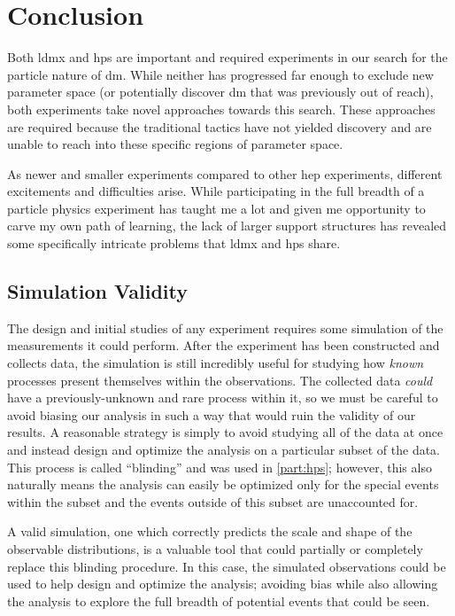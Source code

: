 \chapter{Conclusion}
\label{chapter:conclusion}

Both \ac{ldmx} and \ac{hps} are important and required experiments in our search
for the particle nature of \ac{dm}.
While neither has progressed far enough to exclude new parameter space
(or potentially discover \ac{dm} that was previously out of reach),
both experiments take novel approaches towards this search.
These approaches are required because the traditional tactics have not
yielded discovery and are unable to reach into these specific regions
of parameter space.

As newer and smaller experiments compared to other \ac{hep} experiments,
different excitements and difficulties arise.
While participating in the full breadth of a particle physics experiment
has taught me a lot and given me opportunity to carve my own path of learning,
the lack of larger support structures has revealed some specifically intricate
problems that \ac{ldmx} and \ac{hps} share.

\section{Simulation Validity}
The design and initial studies of any experiment requires some simulation
of the measurements it could perform.
After the experiment has been constructed and collects data, the simulation
is still incredibly useful for studying how \emph{known} processes present
themselves within the observations.
The collected data \emph{could} have a previously-unknown and rare process
within it, so we must be careful to avoid biasing our analysis in such a
way that would ruin the validity of our results.
A reasonable strategy is simply to avoid studying all of the data at once
and instead design and optimize the analysis on a particular subset of the
data.
This process is called ``blinding'' and was used in \cref{part:hps};
however, this also naturally means the analysis can easily be optimized
only for the special events within the subset and the events outside of
this subset are unaccounted for.

A valid simulation, one which correctly predicts the scale and shape
of the observable distributions, is a valuable tool that could partially
or completely replace this blinding procedure.
In this case, the simulated observations could be used to help design
and optimize the analysis; avoiding bias while also allowing the analysis
to explore the full breadth of potential events that could be seen.

